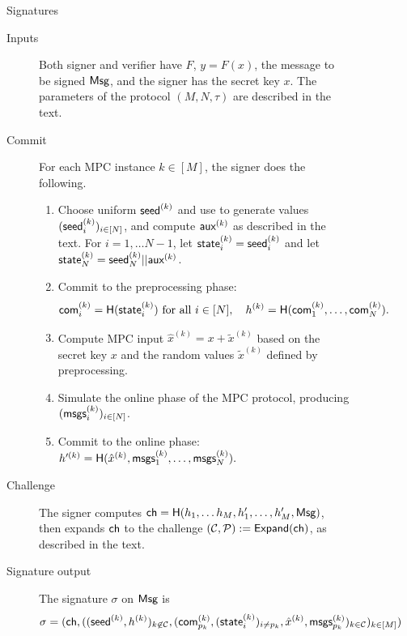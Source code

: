 \begin{figure}[p]
 \begin{minipage}[t]{1.1\textwidth}
 \begin{protocolbox}{\ttOWF Signatures}
 \begin{description}
    \item[Inputs] Both signer and verifier have $F$, $y = F(x)$, the
        message to be signed $\textsf{Msg}$, and the signer has the secret key $x$.  The
            parameters of the protocol $(M, N, \tau)$ are described in the text.
    \item[Commit] For each MPC instance $k\in[M]$, the signer does the following.
    \begin{enumerate}
        \item Choose uniform $\textsf{seed}^{(k)}$ and use  to generate values $(\textsf{seed}^{(k)}_i)_{i \in [N]}$, and compute  
        $\textsf{aux}^{(k)}$ as described in the text. 
        For $i=1,\ldots N-1$, let $\textsf{state}^{(k)}_i = \textsf{seed}^{(k)}_i$ and  let $\textsf{state}^{(k)}_{N} = \textsf{seed}^{(k)}_{N} || \textsf{aux}^{(k)}$.
        \item Commit to the preprocessing phase:
        \begin{align*}
        \textsf{com}^{(k)}_{i} = \textsf{H}(\textsf{state}^{(k)}_i) \text{ for all } i\in [N], \quad 
        h^{(k)} = \textsf{H}(\textsf{com}^{(k)}_{1},\ldots,\textsf{com}^{(k)}_{N}).
        \end{align*}						
        \item Compute MPC input $\hat{x}^{(k)} = x + \tilde{x}^{(k)}$ based on the secret key $x$ and the random values $\tilde{x}^{(k)}$ defined by preprocessing.
        \item Simulate the online phase of the MPC protocol, producing $(\textsf{msgs}^{(k)}_i)_{i \in [N]}$.			
        \item Commit to the online phase:
        $
         h'^{(k)}= \textsf{H}(\hat{x}^{(k)}, \textsf{msgs}_{1}^{(k)}, \ldots, \textsf{msgs}_{N}^{(k)} ).
        $
    \end{enumerate}
    
    \item[Challenge] 
    The signer computes $\textsf{ch} = \textsf{H}(h_1, \ldots h_M, h_1', \ldots, h_M',
    \textsf{Msg})$, then expands $\textsf{ch}$ to the challenge $(\mathcal{C}, \mathcal{P}) := \textsf{Expand}(\textsf{ch})$, as described in the text. 
    
    \item[Signature output]
    The signature $\sigma$ on $\textsf{Msg}$ is 
    \[
    \sigma = (\textsf{ch}, 
              ((\textsf{seed}^{(k)}, h^{(k)} )_{k\not\in\mathcal{C}}, 
              ( \textsf{com}^{(k)}_{p_k}, (\textsf{state}^{(k)}_{i})_{i\neq p_k}, \hat{x}^{(k)}, \textsf{msgs}_{p_k}^{(k)} )_{k\in\mathcal{C}})_{k\in[M]})
    \]
    

\end{description}
\end{protocolbox}
\end{minipage}
\end{figure}

